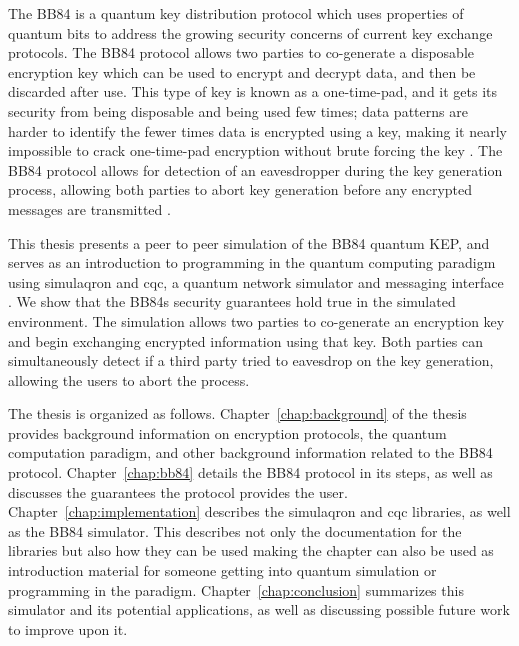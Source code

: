 The BB84 is a quantum key distribution protocol which uses properties of quantum bits to address the growing security concerns of current key exchange protocols.
The BB84 protocol allows two parties to co-generate a disposable encryption key which can be used to encrypt and decrypt data, and then be discarded after use.
This type of key is known as a one-time-pad, and it gets its security from being disposable and being used few times; data patterns are harder to identify the fewer times data is encrypted using a key, making it nearly impossible to crack one-time-pad encryption without brute forcing the key \cite{TODO}.
The BB84 protocol allows for detection of an eavesdropper during the key generation process, allowing both parties to abort key generation before any encrypted messages are transmitted \cite{qcftgu}.

This thesis presents a peer to peer simulation of the BB84 quantum KEP, and serves as an introduction to programming in the quantum computing paradigm using simulaqron and cqc, a quantum network simulator and messaging interface \cite{simulaqron}.
We show that the BB84s security guarantees hold true in the simulated environment.
The simulation allows two parties to co-generate an encryption key and begin exchanging encrypted information using that key.
Both parties can simultaneously detect if a third party tried to eavesdrop on the key generation, allowing the users to abort the process. 

The thesis is organized as follows.
Chapter~\ref{chap:background} of the thesis provides background information on encryption protocols, the quantum computation paradigm, and other background information related to the BB84 protocol. 
Chapter~\ref{chap:bb84} details the BB84 protocol in its steps, as well as discusses the guarantees the protocol provides the user.
Chapter~\ref{chap:implementation} describes the simulaqron and cqc libraries, as well as the BB84 simulator.
This describes not only the documentation for the libraries but also how they can be used making the chapter can also be used as introduction material for someone getting into quantum simulation or programming in the paradigm.
Chapter~\ref{chap:conclusion} summarizes this simulator and its potential applications, as well as discussing possible future work to improve upon it.

